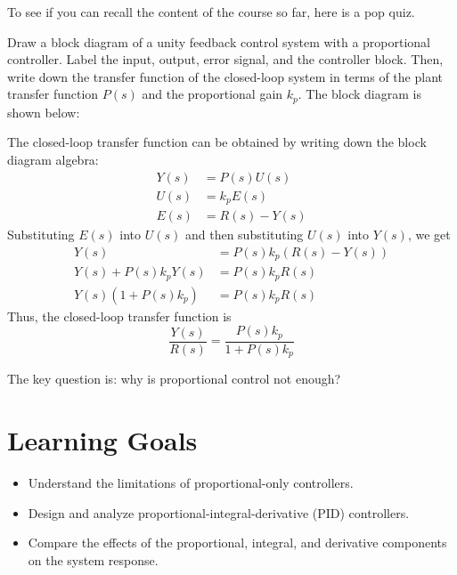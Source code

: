 \documentclass{ee122_notes}
\begin{document}
To see if you can recall the content of the course so far, here is a pop quiz. 
\begin{popquiz}
Draw a block diagram of a unity feedback control system with a proportional controller. Label the input, output, error signal, and the controller block. Then, write down the transfer function of the closed-loop system in terms of the plant transfer function $P(s)$ and the proportional gain $k_p$.
\popqsplit
The block diagram is shown below:

\begin{center}
  \begin{blockdiagram}
  \end{blockdiagram}
  
\end{center}

The closed-loop transfer function can be obtained by writing down the block diagram algebra:
\begin{align*}
    Y(s) &= P(s)U(s) \\
    U(s) &= k_p E(s) \\
    E(s) &= R(s) - Y(s)
\end{align*}
Substituting $E(s)$ into $U(s)$ and then substituting $U(s)$ into $Y(s)$, we get
\begin{align*}
    Y(s) &= P(s) k_p (R(s) - Y(s)) \\
    Y(s) + P(s) k_p Y(s) &= P(s) k_p R(s) \\
    Y(s)(1 + P(s) k_p) &= P(s) k_p R(s)
\end{align*}
Thus, the closed-loop transfer function is
\[
    \frac{Y(s)}{R(s)} = \frac{P(s) k_p}{1 + P(s) k_p}
\]
\end{popquiz}
The key question is: why is proportional control not enough? 
\section{Learning Goals}
\begin{itemize}
    \item Understand the limitations of proportional-only controllers.
    \item Design and analyze proportional-integral-derivative (PID) controllers.
    \item Compare the effects of the proportional, integral, and derivative components on the system response.
\end{itemize}
\end{document}
